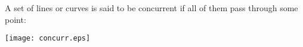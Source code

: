 \documentclass{article}
\begin{document}
A set of lines or curves is said to be concurrent if all of them pass through some point:

\begin{center}
\texttt{[image: concurr.eps]}
\end{center}
\end{document}
